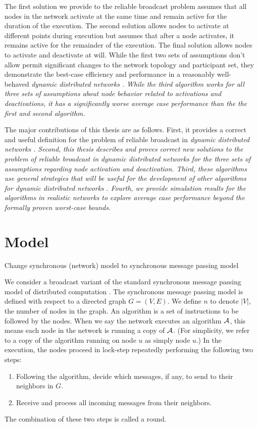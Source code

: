 \documentclass[english]{article}
\begin{document}
The first solution we provide to the reliable broadcast problem assumes that all nodes in the network activate at the same time and remain active for the duration of the execution. The second solution allows nodes to activate at different points during execution but assumes that after a node activates, it remains active for the remainder of the execution.  The final solution allows nodes to activate and deactivate at will. While the first two sets of assumptions don't allow permit significant changes to the network topology and participant set, they demonstrate the best-case efficiency and performance in a reasonably well-behaved \em dynamic distributed networks \em. While the third algorithm works for all three sets of assumptions about node behavior related to activations and deactivations, it has a significantly worse average case performance than the the first and second algorithm. 

The major contributions of this thesis are as follows. First, it provides a correct and useful definition for the problem of reliable broadcast in \em dynamic distributed networks \em. Second, this thesis describes and proves correct new solutions to the problem of reliable broadcast in \em dynamic distributed networks \em for the three sets of assumptions regarding node activation and deactivation. Third, these algorithms use general strategies that will be useful for the development of other algorithms for \em dynamic distributed networks \em. Fourth, we provide simulation results for the algorithms in realistic networks to explore average case performance beyond the formally proven worst-case bounds.

\section{Model}

Change synchronous (network) model to synchronous message passing model

We consider a broadcast variant of the standard synchronous message passing model of distributed computation \cite{Lynch:1996, Kuhn:2010}. The synchronous message passing model is defined with respect to a directed graph $G=(V,E)$. We define $n$ to denote $|V|$, the number of nodes in the graph. An algorithm is a set of instructions to be followed by the nodes. When we say the network executes an algorithm $\cal A$, this means each node in the network is running a copy of $\cal A$. (For simplicity, we refer to a copy of the algorithm running on node $u$ as simply node $u$.) In the execution, the nodes proceed in lock-step repeatedly performing the following two steps:
\begin{enumerate}
  \item Following the algorithm, decide which messages, if any, to send to their neighbors in $G$.
  \item Receive and process all incoming messages from their neighbors.
\end{enumerate}
The combination of these two steps is called a round.
\end{document}
